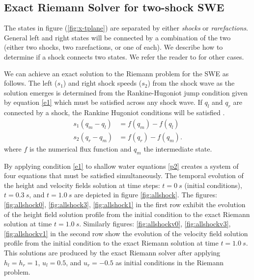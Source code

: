 \documentclass[10pt,a4paper]{article}
\begin{document}
	
	
	\subsection{Exact Riemann Solver for two-shock SWE}
	The states in figure (\ref{fig:x-tplane}) are separated by either {\em shocks} or {\em rarefactions}. General left and right states will be connected by a combination of the two (either two shocks, two rarefactions, or one of each).  We describe how to determine if a shock connects two states.  We refer the reader to   \citet{leveque2002finite} for other cases. 
	
	We can achieve an exact solution to the Riemann problem for the SWE as follows. 
	The left ($s_1$) and right shock speeds ($s_2$)  from the shock wave as the solution emerges is determined from the Rankine-Hugoniot jump condition given by equation \eqref{e1}  which must be satisfied across any shock wave.  If $q_l$ and $q_r$ are connected by a shock, the Rankine Hugoniot conditions will be satisfied \citep{leveque2002finite,toro2001shock}.
	\begin{equation}
		\begin{aligned}
			s_1(q_{m} - q_{l}) & = f(q_{m}) - f(q_{l}) \\
			s_2(q_{r} - q_{m}) & = f(q_{r}) - f(q_{m}).
		\end{aligned}
		\label{e1}
	\end{equation}
	where $f$ is the numerical flux function and $q_m$ the intermediate state. 
	
	By applying condition  \eqref{e1} to shallow water equations \eqref{p2}  creates a system of four equations that must be satisfied simultaneously. The temporal evolution of the height and velocity fields solution at time steps: $t=0~s$ (initial conditions), $t = 0.3~s$, and $t = 1.0~s$ are  depicted in figure \ref{fig:allshock}. The figures: \ref{fig:allshock0}, \ref{fig:allshock3}, \ref{fig:allshock1} in the first row exhibit the evolution of the height field solution profile from the initial condition to the exact Riemann solution at time $t = 1.0~s$. Similarly figures: \ref{fig:allshockv0}, \ref{fig:allshockv3}, \ref{fig:allshockv1} in the second row show the evolution of the velocity field solution profile from the initial condition to the exact Riemann solution at time $t = 1.0~s$. This solutions are produced by the exact Riemann solver after applying $h_l = h_r = 1$, $u_l  =  0.5$, and $u_r = -0.5$ as initial conditions in  the Riemann problem.
	
\end{document}
